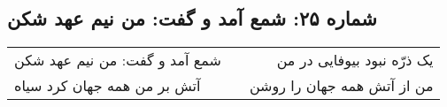 \begin{center}
\section*{شماره ۲۵: شمع آمد و گفت: من نیم عهد شکن}
\label{sec:025}
\begin{longtable}{l p{0.5cm} r}
شمع آمد و گفت: من نیم عهد شکن
&&
یک ذرّه نبود بیوفایی در من
\\
آتش بر من همه جهان کرد سیاه
&&
من از آتش همه جهان را روشن
\\
\end{longtable}
\end{center}
